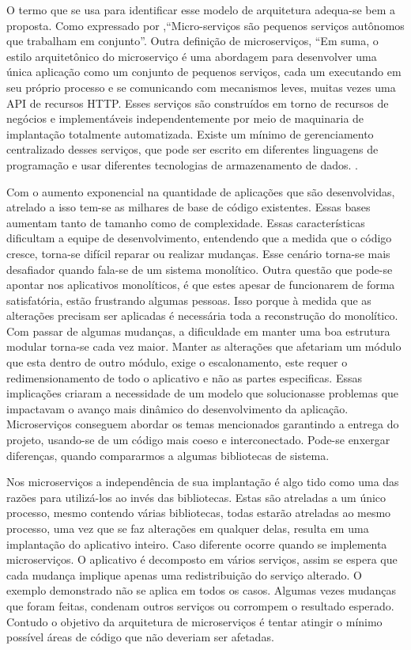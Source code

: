 O termo que se usa para identificar esse modelo de arquitetura adequa-se bem a proposta.
Como expressado por \cite{building-microservices},“Micro-serviços são pequenos serviços autônomos que trabalham em conjunto”.
Outra definição de microserviços, “Em suma, o estilo arquitetônico do microserviço é uma abordagem para desenvolver
uma única aplicação como um conjunto de pequenos serviços, cada um executando em seu próprio processo e se comunicando 
com mecanismos leves, muitas vezes uma API de recursos HTTP. Esses serviços são construídos em torno de recursos de 
negócios e implementáveis independentemente por meio de maquinaria de implantação totalmente automatizada.
Existe um mínimo de gerenciamento centralizado desses serviços, que pode ser escrito em diferentes linguagens de 
programação e usar diferentes tecnologias de armazenamento de dados. \cite{martin-fowler-microservices}.


Com o aumento exponencial na quantidade de aplicações que são desenvolvidas, atrelado a isso tem-se as milhares de base 
de código existentes. Essas bases aumentam tanto de tamanho como de complexidade. Essas características dificultam a 
equipe de desenvolvimento, entendendo que a medida que o código cresce, torna-se difícil reparar ou realizar mudanças. 
Esse cenário torna-se mais desafiador quando fala-se de um sistema monolítico. Outra questão que pode-se apontar 
nos aplicativos monolíticos, é que estes apesar de funcionarem de forma satisfatória, estão frustrando algumas pessoas.
Isso porque à medida que as alterações precisam ser aplicadas é necessária toda a reconstrução do monolítico. Com passar 
de algumas mudanças, a dificuldade em manter uma boa estrutura modular torna-se cada vez maior. Manter as alterações 
que  afetariam um módulo que esta dentro de outro módulo, exige o escalonamento, este requer o redimensionamento de todo 
o aplicativo e não as partes especificas. Essas implicações criaram a necessidade de um modelo que solucionasse problemas 
que impactavam o avanço mais dinâmico do desenvolvimento da aplicação.
Microserviços conseguem abordar os temas mencionados garantindo a entrega do projeto, usando-se de um código mais coeso 
e interconectado.  Pode-se enxergar diferenças, quando compararmos a algumas bibliotecas de sistema.


Nos microserviços a independência de sua implantação é algo tido como uma das razões para utilizá-los ao invés das
bibliotecas. Estas são atreladas a um único processo, mesmo contendo várias bibliotecas, todas estarão atreladas ao mesmo
processo, uma vez que se faz alterações em qualquer delas, resulta em uma implantação do aplicativo inteiro. Caso diferente
ocorre quando se implementa microserviços. O aplicativo é decomposto em vários serviços, assim se espera que cada mudança
implique apenas uma redistribuição do serviço alterado. O exemplo demonstrado não se aplica em todos os casos. Algumas 
vezes mudanças que foram feitas, condenam outros serviços ou corrompem o resultado esperado. Contudo o objetivo da
arquitetura de microserviços é tentar atingir o mínimo possível áreas de código que não deveriam ser afetadas.



